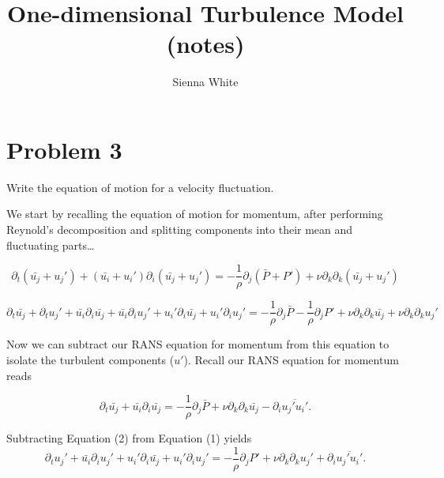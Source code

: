\documentclass[
  letterpaper,
  DIV=11,
  numbers=noendperiod]{scrartcl}
\title{One-dimensional Turbulence Model (notes)}
\author{Sienna White}
\date{}
\begin{document}
\maketitle
\ifdefined\Shaded\renewenvironment{Shaded}{\begin{tcolorbox}[sharp corners, breakable, enhanced, frame hidden, borderline west={3pt}{0pt}{shadecolor}, interior hidden, boxrule=0pt]}{\end{tcolorbox}}\fi

\section{Problem 3}

Write the equation of motion for a velocity fluctuation.

We start by recalling the equation of motion for momentum, after
performing Reynold's decomposition and splitting components into their
mean and fluctuating parts\ldots{}

\[ \partial_t (\bar{u_j} + u_j') + (\bar{u_i} + u_i') \partial_i (\bar{u_j} + u_j') = - \frac{1}{\rho} \partial_j (\bar{P} +P') + \nu \partial_k \partial_k (\bar{u_j} + u_j')\]

\begin{equation}
     \partial_t \bar{u_j}  + \partial_t u_j' + \bar{u_i} \partial_i \bar{u_j} + \bar{u_i} \partial_i u_j' + u_i' \partial_i \bar{u_j}  + u_i' \partial_i u_j' = 
     - \frac{1}{\rho} \partial_j \bar{P} - \frac{1}{\rho} \partial_j P' + \nu \partial_k \partial_k \bar{u_j} +\nu \partial_k \partial_k u_j'
\end{equation}

Now we can subtract our RANS equation for momentum from this equation to
isolate the turbulent components (\(u'\)). Recall our RANS equation for
momentum reads

\begin{equation}
     \partial_t \bar{u_j}  + \bar{u_i} \partial_i \bar{u_j}  =  - \frac{1}{\rho} \partial_j \bar{P}  + \nu \partial_k \partial_k \bar{u_j} -  \partial_i \overline{u_j'u_i'}  . 
\end{equation}

Subtracting Equation (2) from Equation (1) yields \begin{equation}
     \partial_t u_j' + \bar{u_i} \partial_i u_j' + u_i' \partial_i \bar{u_j}  + u_i' \partial_i u_j' =  - \frac{1}{\rho} \partial_j P'  +\nu \partial_k \partial_k u_j' + \partial_i \overline{u_j'u_i'}  . 
\end{equation}
\end{document}
